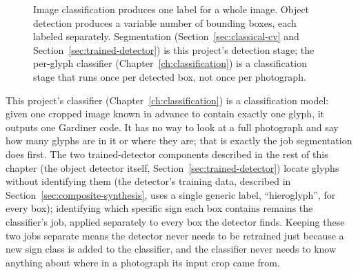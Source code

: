 \documentclass[11pt,a4paper]{report}
\begin{document}
\begin{figure}[t]
\centering
{}
\caption{Image classification produces one label for a whole image.
Object detection produces a variable number of bounding boxes, each labeled
separately. Segmentation (Section~\ref{sec:classical-cv} and
Section~\ref{sec:trained-detector}) is this project's detection stage; the
per-glyph classifier (Chapter~\ref{ch:classification}) is a classification
stage that runs once per detected box, not once per photograph.}
\label{fig:detection-vs-classification}
\end{figure}

This project's classifier (Chapter~\ref{ch:classification}) is a
classification model: given one cropped image known in advance to contain
exactly one glyph, it outputs one Gardiner code. It has no way to look at a
full photograph and say how many glyphs are in it or where they are; that
is exactly the job segmentation does first. The two trained-detector
components described in the rest of this chapter (the object detector
itself, Section~\ref{sec:trained-detector}) locate glyphs without
identifying them (the detector's training data, described in
Section~\ref{sec:composite-synthesis}, uses a single generic label,
``hieroglyph'', for every box); identifying which specific sign each box
contains remains the classifier's job, applied separately to every box the
detector finds. Keeping these two jobs separate means the detector never
needs to be retrained just because a new sign class is added to the
classifier, and the classifier never needs to know anything about where in
a photograph its input crop came from.
\end{document}
